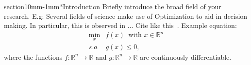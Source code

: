 \documentclass[a0,portrait]{a0poster}
\makeatletter
\renewcommand{\LARGE}{\fontsize{50}{70}\selectfont\bfseries} %
\renewcommand{\section}{\@startsection%
  {section}{1}{0mm}{-\baselineskip}{1mm}{\LARGE\color{myred}\bfseries}}
\makeatother
\begin{document}
\vspace{2cm}
\begin{multicols}{2}
\section*{\textcolor{myblue}{Introduction}}
\textcolor{myblue}{
Briefly introduce the broad field of your research. E.g: Several fields of science make use of Optimization to aid in decision making. In particular, this is observed in ...
Cite like this~\cite{Reference4, Reference6}.
Example equation:
\begin{equation}\label{problema_geral}
\begin{array}{cl}
\displaystyle\min_{x}&f(x)\ \mbox{ with } x \in \mathbb{R}^n  \\
s.a & g(x)\leq 0,
\end{array}
\end{equation}
where the functions $f:\mathbb{R}^{n}\rightarrow\mathbb{R}$ and $g:\mathbb{R}^{n}\rightarrow\mathbb{R}$ are continuously differentiable.}

\end{multicols}
\end{document}
